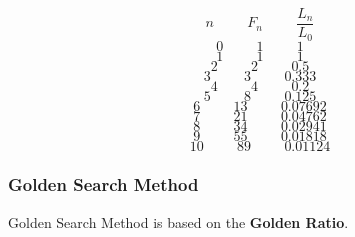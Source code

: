 \documentclass[12pt, letterpaper]{article}
\begin{document}
$$ n \hspace{1cm} F_n \hspace{1cm} \frac{L_n}{L_0}  $$
$$ 0 \hspace{1cm} 1	  \hspace{1cm}		1 $$
$$ 1 \hspace{1cm} 1	  \hspace{1cm}		1 $$
$$ 2 \hspace{1cm} 2   \hspace{1cm}		0.5 $$
$$ 3 \hspace{1cm} 3   \hspace{1cm}   	0.333 $$
$$ 4 \hspace{1cm} 4   \hspace{1cm}		0.2 $$
$$ 5 \hspace{1cm} 8   \hspace{1cm}		0.125 $$
$$ 6 \hspace{1cm} 13  \hspace{1cm}		0.07692 $$
$$ 7 \hspace{1cm} 21  \hspace{1cm}		0.04762 $$
$$ 8 \hspace{1cm} 34  \hspace{1cm}		0.02941 $$
$$ 9 \hspace{1cm} 55  \hspace{1cm}		0.01818 $$
$$ 10 \hspace{1cm}89  \hspace{1cm}		0.01124 $$

\subsubsection{Golden Search Method}
Golden Search Method is based on the \textbf{Golden Ratio}.
\end{document}
